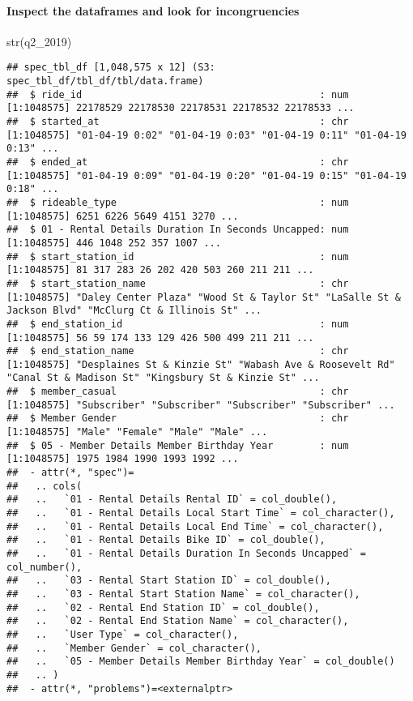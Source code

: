 \documentclass[
]{article}
\newenvironment{Shaded}{\begin{snugshade}}{\end{snugshade}}
\newcommand{\FunctionTok}[1]{\textcolor[rgb]{0.00,0.00,0.00}{#1}}
\newcommand{\NormalTok}[1]{#1}
\begin{document}
\hypertarget{inspect-the-dataframes-and-look-for-incongruencies}{%
\paragraph{Inspect the dataframes and look for
incongruencies}\label{inspect-the-dataframes-and-look-for-incongruencies}}

\begin{Shaded}
\begin{Highlighting}[]
\FunctionTok{str}\NormalTok{(q2\_2019)}
\end{Highlighting}
\end{Shaded}

\begin{verbatim}
## spec_tbl_df [1,048,575 x 12] (S3: spec_tbl_df/tbl_df/tbl/data.frame)
##  $ ride_id                                         : num [1:1048575] 22178529 22178530 22178531 22178532 22178533 ...
##  $ started_at                                      : chr [1:1048575] "01-04-19 0:02" "01-04-19 0:03" "01-04-19 0:11" "01-04-19 0:13" ...
##  $ ended_at                                        : chr [1:1048575] "01-04-19 0:09" "01-04-19 0:20" "01-04-19 0:15" "01-04-19 0:18" ...
##  $ rideable_type                                   : num [1:1048575] 6251 6226 5649 4151 3270 ...
##  $ 01 - Rental Details Duration In Seconds Uncapped: num [1:1048575] 446 1048 252 357 1007 ...
##  $ start_station_id                                : num [1:1048575] 81 317 283 26 202 420 503 260 211 211 ...
##  $ start_station_name                              : chr [1:1048575] "Daley Center Plaza" "Wood St & Taylor St" "LaSalle St & Jackson Blvd" "McClurg Ct & Illinois St" ...
##  $ end_station_id                                  : num [1:1048575] 56 59 174 133 129 426 500 499 211 211 ...
##  $ end_station_name                                : chr [1:1048575] "Desplaines St & Kinzie St" "Wabash Ave & Roosevelt Rd" "Canal St & Madison St" "Kingsbury St & Kinzie St" ...
##  $ member_casual                                   : chr [1:1048575] "Subscriber" "Subscriber" "Subscriber" "Subscriber" ...
##  $ Member Gender                                   : chr [1:1048575] "Male" "Female" "Male" "Male" ...
##  $ 05 - Member Details Member Birthday Year        : num [1:1048575] 1975 1984 1990 1993 1992 ...
##  - attr(*, "spec")=
##   .. cols(
##   ..   `01 - Rental Details Rental ID` = col_double(),
##   ..   `01 - Rental Details Local Start Time` = col_character(),
##   ..   `01 - Rental Details Local End Time` = col_character(),
##   ..   `01 - Rental Details Bike ID` = col_double(),
##   ..   `01 - Rental Details Duration In Seconds Uncapped` = col_number(),
##   ..   `03 - Rental Start Station ID` = col_double(),
##   ..   `03 - Rental Start Station Name` = col_character(),
##   ..   `02 - Rental End Station ID` = col_double(),
##   ..   `02 - Rental End Station Name` = col_character(),
##   ..   `User Type` = col_character(),
##   ..   `Member Gender` = col_character(),
##   ..   `05 - Member Details Member Birthday Year` = col_double()
##   .. )
##  - attr(*, "problems")=<externalptr>
\end{verbatim}
\end{document}
